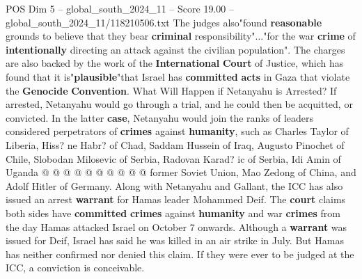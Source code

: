\begin{textsample}{POS Dim 5 – global\_south\_2024\_11 – Score 19.00 – global\_south\_2024\_11/118210506.txt}
The judges also"found \textbf{reasonable} grounds to believe that they bear \textbf{criminal} responsibility"..."for the war \textbf{crime} of \textbf{intentionally} directing an attack against the civilian population".
The charges are also backed by the work of the \textbf{International} \textbf{Court} of Justice, which has found that it is"\textbf{plausible}"that Israel has \textbf{committed} \textbf{acts} in Gaza that violate the \textbf{Genocide} \textbf{Convention}.
What Will Happen if Netanyahu is Arrested?
If arrested, Netanyahu would go through a trial, and he could then be acquitted, or convicted.
In the latter \textbf{case}, Netanyahu would join the ranks of leaders considered perpetrators of \textbf{crimes} against \textbf{humanity}, such as Charles Taylor of Liberia, Hiss? ne Habr? of Chad, Saddam Hussein of Iraq, Augusto Pinochet of Chile, Slobodan Milosevic of Serbia, Radovan Karad? ic of Serbia, Idi Amin of Uganda @ @ @ @ @ @ @ @ @ @ former Soviet Union, Mao Zedong of China, and Adolf Hitler of Germany.
Along with Netanyahu and Gallant, the ICC has also issued an arrest \textbf{warrant} for Hamas leader Mohammed Deif.
The \textbf{court} claims both sides have \textbf{committed} \textbf{crimes} against \textbf{humanity} and war \textbf{crimes} from the day Hamas attacked Israel on October 7 onwards.
Although a \textbf{warrant} was issued for Deif, Israel has said he was killed in an air strike in July.
But Hamas has neither confirmed nor denied this claim.
If they were ever to be judged at the ICC, a conviction is conceivable.

\end{textsample}
